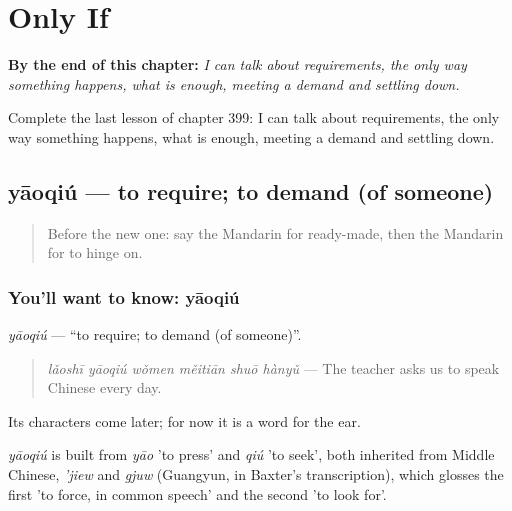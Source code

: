 
\chapter{Only If}
\label{ch:zh-only-if}

\begin{chapteropening}
\textbf{By the end of this chapter:} \emph{I can talk about requirements, the only way something happens, what is enough, meeting a demand and settling down.}

Complete the last lesson of chapter 399: I can talk about requirements, the only way something happens, what is enough, meeting a demand and settling down.
\end{chapteropening}

\section[yāoqiú]{yāoqiú — to require; to demand (of someone)}

\label{lesson:ZH-C399-yaoqiu}



\begin{quote}
Before the new one: say the Mandarin for ready-made, then the Mandarin for to hinge on.
\end{quote}

\subsection*{You'll want to know: yāoqiú}
\emph{yāoqiú} — \textquotedblleft{}to require; to demand (of someone)\textquotedblright{}.

\begin{quote}
\emph{lǎoshī yāoqiú wǒmen měitiān shuō hànyǔ} — The teacher asks us to speak Chinese every day.
\end{quote}

Its characters come later; for now it is a word for the ear.

\begin{cousinweb}
\emph{yāoqiú} is built from \emph{yāo} 'to press' and \emph{qiú} 'to seek', both inherited from Middle Chinese, \emph{'jiew} and \emph{gjuw} (Guangyun, in Baxter's transcription), which glosses the first 'to force, in common speech' and the second 'to look for'.
\end{cousinweb}

